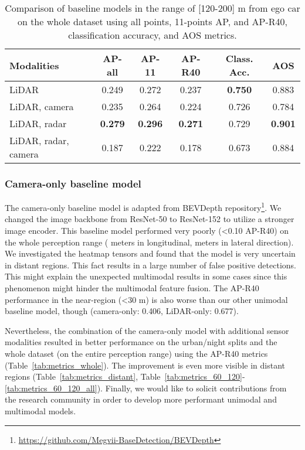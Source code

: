 \documentclass{article}
\begin{document}
\begin{table*}[!h]
  \small
  \centering
  \begin{tabular}{@{}l|ccccc@{}}
    \toprule
    Modalities          & AP-all    & AP-11     & AP-R40    & Class. Acc.   & AOS\\
    \midrule
    LiDAR               & 0.249     & 0.272     & 0.237     & \bf{0.750}    & 0.883 \\
    LiDAR, camera       & 0.235     & 0.264     & 0.224     & 0.726         & 0.784 \\
    LiDAR, radar        & \bf{0.279}& \bf{0.296}& \bf{0.271}& 0.729         & \bf{0.901} \\
    LiDAR, radar, camera & 0.187    & 0.222     & 0.178     & 0.673         & 0.884 \\
    \bottomrule
  \end{tabular}
  \caption{Comparison of baseline models in the range of [120-200] m from ego car on the whole dataset using all points, 11-points AP, and AP-R40, classification accuracy, and AOS metrics.}
  \label{tab:metrics14}
\end{table*}

\subsubsection{Camera-only baseline model}
The camera-only baseline model is adapted from BEVDepth repository\footnote{\href{https://github.com/Megvii-BaseDetection/BEVDepth}{https://github.com/Megvii-BaseDetection/BEVDepth}}. We changed the image backbone from ResNet-50 to ResNet-152 to utilize a stronger image encoder. This baseline model performed very poorly (<0.10 AP-R40) on the whole perception range ( meters in longitudinal,  meters in lateral direction). We investigated the heatmap tensors and found that the model is very uncertain in distant regions. This fact results in a large number of false positive detections. This might explain the unexpected multimodal results in some cases since this phenomenon might hinder the multimodal feature fusion. The AP-R40 performance in the near-region (<30 m) is also worse than our other unimodal baseline model, though (camera-only: 0.406,  LiDAR-only: 0.677).

Nevertheless, the combination of the camera-only model with additional sensor modalities resulted in better performance on the urban/night splits and the whole dataset (on the entire perception range) using the AP-R40 metrics (Table~\ref{tab:metrics_whole}). The improvement is even more visible in distant regions (Table~\ref{tab:metrics_distant}, Table~\ref{tab:metrics_60_120}-\ref{tab:metrics_60_120_all}). Finally, we would like to solicit contributions from the research community in order to develop more performant unimodal and multimodal models.
\end{document}
